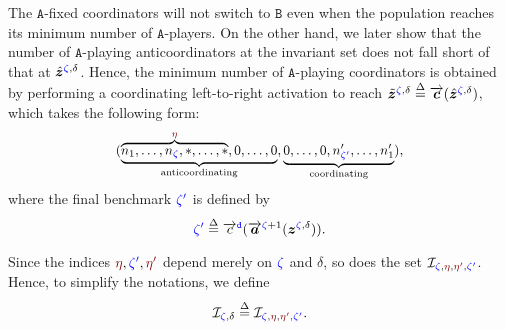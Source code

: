 \documentclass[10 pt,twocolumn,journal]{IEEEtran}
\theoremstyle{plain}
\newcommand{\db}{\overset{\Delta}{=}}
\newcommand{\A}{\mathcal{A}}
\newcommand{\I}{\mathcal{I}}
\newcommand{\z}{\bm{z}}
\renewcommand{\a}{\bm{a}}
\renewcommand{\c}{\bm{c}}
\renewcommand{\r}{\tb{\zeta}}
\newcommand{\rr}{\tb{\zeta'}}
\newcommand{\s}{\tr{\eta}}
\renewcommand{\ss}{\tr{\eta'}}
\renewcommand{\d}{{\delta}}
\newcommand{\nn}{\tb{\mathtt{d}}}
\renewcommand{\A}{\mathtt{A}}
\newcommand{\B}{\mathtt{B}}
\newcommand{\tb}{\textcolor{blue}}
\newcommand{\tr}{\textcolor{Myred}}
\theoremstyle{definition}
\begin{document}
The $\A$-fixed coordinators will not switch to $\B$ even when the population reaches its minimum number of $\A$-players.
On the other hand, we later show that the number of $\A$-playing anticoordinators at the invariant set does not fall short of that at $\hat{\z}^{\r,\d}$.
Hence, the minimum number of $\A$-playing coordinators is obtained by performing a coordinating left-to-right activation to reach $\tilde{\z}^{\r,\d} \db \overrightarrow{\c}(\hat{\z}^{\r,\d})$, which takes the following form:
\begin{equation*}\scalebox{.96}{\text{$
    (\underbrace{\overbrace{n_1,\ldots,n_{\r},*,\ldots,*}^{\s},
    0,\ldots,0}_{\text{anticoordinating}}, 
    \underbrace{0,\ldots,0, n'_{\rr}, \ldots, n'_{1}}_{\text{coordinating}})
$}},
\end{equation*}
where the final benchmark $\rr$ is defined by
\begin{equation}
    \rr \db 
    \overrightarrow{c}^{\nn}(\overrightarrow{\a}^{\r+1}(\z^{\r,\d})).  \label{th1_def4}
\end{equation}

Since the indices $\s,\rr,\ss$ depend merely on $\r$ and $\d$, so does the set $\I_{\r, \s, \ss, \rr}$. 
Hence, to simplify the notations, we define
\begin{equation}
    \I_{\r,\d} \db \I_{\r, \s, \ss, \rr}. \label{th1_def5}
\end{equation}

\end{document}
